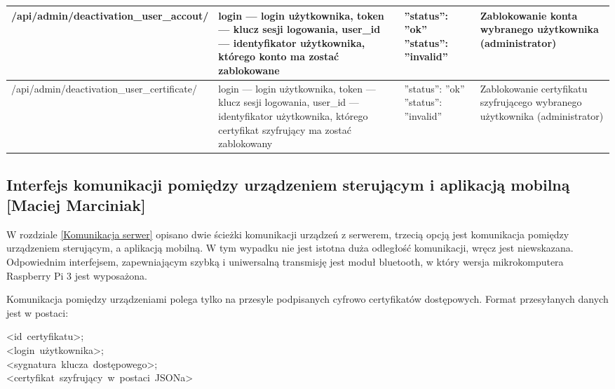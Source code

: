 \begin{landscape}
\begin{longtable}[!ht]{|m{5cm}|m{6.5cm}|m{5cm}|m{5.5cm}|}
		/api/admin/\-deactivation\_user\_accout/ & login --- login użytkownika, \newline token --- klucz sesji logowania, \newline user\_id --- identyfikator użytkownika, którego konto ma zostać zablokowane & ''status'': ''ok'' \tablinia ''status'': ''invalid'' & Zablokowanie konta wybranego użytkownika (administrator) \\ \hline
		/api/admin/deactivation\-\_user\_certificate/ & login --- login użytkownika, \newline token --- klucz sesji logowania, \newline user\_id --- identyfikator użytkownika, którego certyfikat szyfrujący ma zostać zablokowany & ''status'': ''ok'' \tablinia ''status'': ''invalid'' & Zablokowanie certyfikatu szyfrującego wybranego użytkownika (administrator) \\ \hline
	\end{longtable}
\end{landscape}
\newpage
\subsection{Interfejs komunikacji pomiędzy urządzeniem sterującym i aplikacją mobilną [Maciej Marciniak]}
W rozdziale \ref{Komunikacja serwer} opisano dwie ścieżki komunikacji urządzeń z serwerem, trzecią opcją jest komunikacja pomiędzy urządzeniem sterującym, a aplikacją mobilną. W tym wypadku nie jest istotna duża odległość komunikacji, wręcz jest niewskazana. Odpowiednim interfejsem, zapewniającym szybką i uniwersalną transmisję jest moduł bluetooth, w który wersja mikrokomputera Raspberry Pi 3 jest wyposażona. 

Komunikacja pomiędzy urządzeniami polega tylko na przesyle podpisanych cyfrowo certyfikatów dostępowych. Format przesyłanych danych jest w postaci: \\
\begin{minipage}[t]{8cm}
	<id~certyfikatu>;\\<login~użytkownika>;\\<sygnatura~klucza~dostępowego>;\\<certyfikat~szyfrujący~w~postaci~JSONa>
\end{minipage} 

